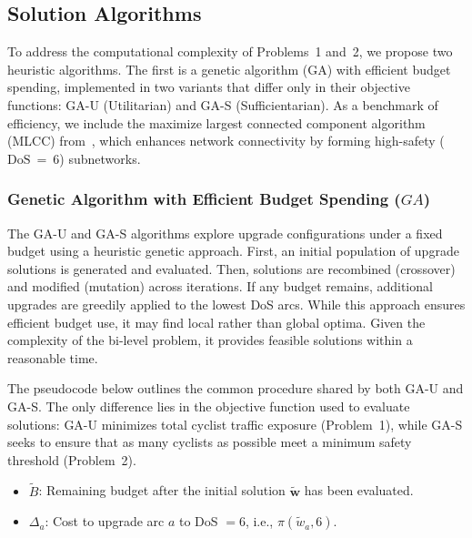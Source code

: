 \documentclass[letterpaper, 10 pt, conference]{ieeeconf}  %
\begin{document}
\subsection{Solution Algorithms} 

To address the computational complexity of Problems~1 and~2, we propose two heuristic algorithms. The first is a genetic algorithm (GA) with efficient budget spending, implemented in two variants that differ only in their objective functions: \mbox{GA-U}  (Utilitarian) and \mbox{GA-S}  (Sufficientarian). As a benchmark of efficiency, we include the maximize largest connected component algorithm (MLCC) from~\cite{2024graphbased}, which enhances network connectivity by forming high-safety ($\text{DoS}~=~6$) subnetworks.




\subsubsection{Genetic Algorithm with Efficient Budget Spending ($GA$)}
The \mbox{GA-U} and \mbox{GA-S}  algorithms explore upgrade configurations under a fixed budget using a heuristic genetic approach. First, an initial population of upgrade solutions is generated and evaluated. Then, solutions are recombined (crossover) and modified (mutation) across iterations. If any budget remains, additional upgrades are greedily applied to the lowest DoS arcs. While this approach ensures efficient budget use, it may find local rather than global optima. Given the complexity of the bi-level problem, it provides feasible solutions within a reasonable time.

The pseudocode below outlines the common procedure shared by both \mbox{GA-U} and \mbox{GA-S}. The only difference lies in the objective function used to evaluate solutions: \mbox{GA-U} minimizes total cyclist traffic exposure (Problem~1), while \mbox{GA-S}  seeks to ensure that as many cyclists as possible meet a minimum safety threshold (Problem~2).

\begin{itemize}
    \item $\tilde{B}$: Remaining budget after the initial solution $\tilde{\mathbf{w}}$ has been evaluated.
    \item $\Delta_a$: Cost to upgrade arc $a$ to DoS $=6$, i.e., $\pi(\tilde{w}_a, 6)$.
\end{itemize}
\end{document}
